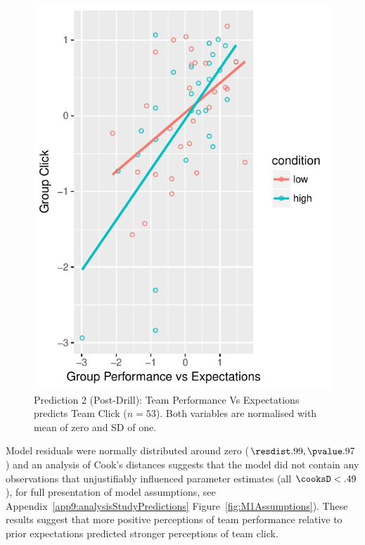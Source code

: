 \begin{CJK}{UTF8}{gbsn}
\begin{figure}
    \centering
    \includegraphics[width=0.5\linewidth,keepaspectratio] {images/teamPerfExpClickScatter}
    \caption{Prediction 2 (Post-Drill): Team Performance Vs Expectations predicts Team Click ($n = 53$).  Both variables are normalised with mean of zero and SD of one.}
    \label{fig:teamPerfExpClickScatter}
\end{figure}

Model residuals were normally distributed around zero ($\resdist .99, \pvalue .97$) and an analysis of Cook's distances suggests that the model did not contain any observations that unjustifiably influenced parameter estimates (all $\cooksD < .49$), for full presentation of model assumptions, see Appendix~\ref{app9:analysisStudyPredictions} Figure~\ref{fig:M1Assumptions}).  These results suggest that more positive perceptions of team performance relative to prior expectations predicted stronger perceptions of team click.



\end{CJK}
